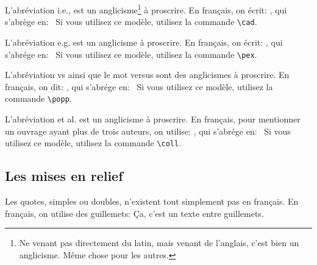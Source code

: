 \documentclass[utf8x]{article-hermes_frenchb}
\begin{document}
L'abréviation
i.e., 
est un anglicisme\footnote{
Ne venant pas directement du latin,
mais venant de l'anglais,
c'est bien un anglicisme.
Même chose pour les autres.
}
à proscrire.
En français, on écrit:
\CAD, qui s'abrège en: \cad\
Si vous utilisez ce modèle, 
utilisez la commande \verb+\cad+.

L'abréviation
e.g.
est un anglicisme à proscrire.
En français, on écrit:
\PEX, qui s'abrége en: \pex\
Si vous utilisez ce modèle, 
utilisez la commande \verb+\pex+.

L'abréviation
vs ainsi que le mot versus
sont des anglicismes à proscrire.
En français, on dit:
\POPP, qui s'abrége en: \popp\
Si vous utilisez ce modèle, 
utilisez la commande \verb+\popp+.

L'abréviation
et al.
est un anglicisme à proscrire.
En français,
pour mentionner un ouvrage ayant plus de trois auteurs,
on utilise:
\COLL, qui s'abrége en: \coll\
Si vous utilisez ce modèle, 
utilisez la commande \verb+\coll+.
\cite{Celata_TAL_52}


\subsection{Les mises en relief}

Les quotes, simples ou doubles, n'existent tout simplement pas en français.
En français,
on utilise des guillemets:
{\og}Ça, c'est un texte entre guillemets.{\fg}
\end{document}

